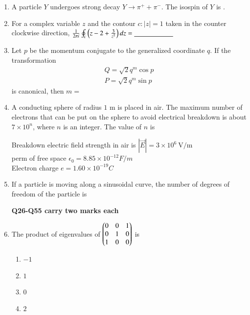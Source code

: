 \documentclass[journal,12pt,onecolumn]{IEEEtran}
\theoremstyle{remark}
\begin{document}
\begin{enumerate}
    \item A particle $Y$ undergoes strong decay $Y \rightarrow \pi^+ + \pi^-$. The isospin of $Y$ is \underline{\hspace{2cm}}.
\item For a complex variable $z$ and the contour $c:|z|=1$ taken in the counter clockwise direction,
    $
        \frac{1}{2\pi i} \oint_c \left(z - 2 + \frac{3}{z^2}\right) dz = \underline{\hspace{2cm}}
    $
    
    \item Let $p$ be the momentum conjugate to the generalized coordinate $q$. If the transformation
    \begin{align}
        Q = \sqrt{2} q^m \cos p \\
        P = \sqrt{2} q^m \sin p
    \end{align}
    is canonical, then $m =$ \underline{\hspace{2cm}}
    
    \item A conducting sphere of radius $1$ m is placed in air. The maximum number of electrons that can be put on the sphere to avoid electrical breakdown is about $7 \times 10^n$, where $n$ is an integer. The value of $n$ is \underline{\hspace{2cm}}
    
    
    Breakdown electric field strength in air is $|\vec{E}|=3 \times 10^6~\text{V/m}$ \\
   perm of free space  $\epsilon_0 = 8.85 \times 10^{-12}{F/m}$\\
    Electron charge $ e = 1.60 \times 10^{-19}C$

    
    
    \item If a particle is moving along a sinusoidal curve, the number of degrees of freedom of the particle is \underline{\hspace{2cm}}
    
    \textbf{Q26-Q55 carry two marks each }
    
    \item The product of eigenvalues of
    $
        \begin{pmatrix}
            0 & 0 & 1 \\
            0 & 1 & 0 \\
            1 & 0 & 0\end{pmatrix}
    $
    is
    
    \begin{enumerate}
        \item $-1$
        \item $1$
        \item $0$
        \item $2$
    \end{enumerate}
    


\end{enumerate}
\end{document}
